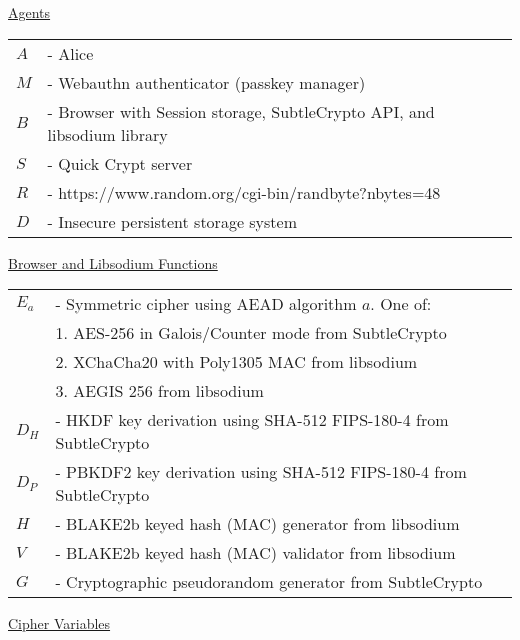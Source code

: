 \documentclass{article}
\begin{document}
\underline{Agents}\\

\begin{tabular}{@{}p{2mm} l}
$A$ & \textrm{ - Alice} \\
$M$ & \textrm{ - Webauthn authenticator (passkey manager)} \\
$B$ & \textrm{ - Browser with Session storage, SubtleCrypto API, and libsodium library} \\
$S$ & \textrm{ - Quick Crypt server} \\
$R$ & \textrm{ - https://www.random.org/cgi-bin/randbyte?nbytes=48} \\
$D$ & \textrm{ - Insecure persistent storage system} \\
\end{tabular}
      
\hfill \break


\underline{Browser and Libsodium Functions}\\

\begin{tabular}{@{}p{2mm} l}
$E_a$ & \textrm{ - Symmetric cipher using AEAD algorithm }$a$\textrm{. One of:}\\
& \hspace{23pt}\textrm{1. AES-256 in Galois/Counter mode from SubtleCrypto} \\
& \hspace{23pt}\textrm{2. XChaCha20 with Poly1305 MAC from libsodium} \\
& \hspace{23pt}\textrm{3. AEGIS 256 from libsodium} \\
$D_H$ & \textrm{ - HKDF key derivation using SHA-512 FIPS-180-4 from SubtleCrypto} \\
$D_P$ & \textrm{ - PBKDF2 key derivation using SHA-512 FIPS-180-4 from SubtleCrypto} \\
$H$ & \textrm{ - BLAKE2b keyed hash (MAC) generator from libsodium} \\
$V$ & \textrm{ - BLAKE2b keyed hash (MAC) validator from libsodium} \\
$G$ & \textrm{ - Cryptographic pseudorandom generator from SubtleCrypto} \\
\end{tabular}

\hfill \break

\underline{Cipher Variables}\\
\end{document}
